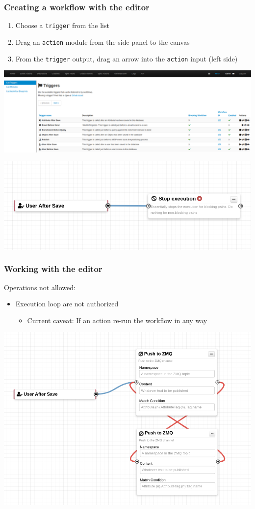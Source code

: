 \begin{frame}
    \frametitle{Creating a workflow with the editor}
    \begin{enumerate}
        \item Choose a \texttt{trigger} from the list
        \item Drag an \texttt{action} module from the side panel to the canvas
        \item From the \texttt{trigger} output, drag an arrow into the \texttt{action} input (left side)
    \end{enumerate}
    \begin{center}
        \includegraphics[width=0.8\linewidth]{pictures/usage-1.png}
    \end{center}
    \begin{center}
        \includegraphics[width=0.50\linewidth]{pictures/editor-1.png}
    \end{center}
\end{frame}

\begin{frame}
    \frametitle{Working with the editor}
    Operations not allowed:
    \begin{itemize}
        \item Execution loop are not authorized
        \begin{itemize}
            \item Current caveat: If an action re-run the workflow in any way
        \end{itemize}
    \end{itemize}
    \begin{center}
        \includegraphics[width=0.7\linewidth]{pictures/editor-not-allowed-1.png}
    \end{center}
\end{frame}

